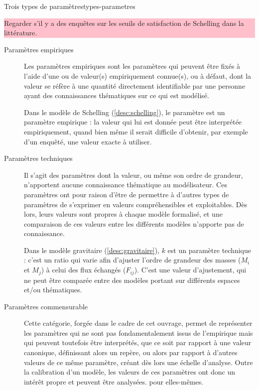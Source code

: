 \documentclass[12pt, a4paper, oneside]{book}
\begin{document}
	
	\begin{encadre}{Trois types de paramètres}{types-parametres}
		
		\colorbox{pink}{\parbox{0.9\textwidth}{%
				\vskip5pt
				Regarder s'il y a des enquêtes sur les seuils de satisfaction de Schelling dans la littérature.
				\vskip5pt
			}
		}
	
		\begin{description}
			\item[Paramètres empiriques] Les paramètres empiriques sont les paramètres qui peuvent être fixés à l'aide d'une ou de valeur(s) empiriquement connue(s), ou à défaut, dont la valeur se réfère à une quantité directement identifiable par une personne ayant des connaissances thématiques sur ce qui est modélisé.
			\begin{mdframed}[backgroundcolor=gray!10,footnoteinside=false]
				Dans le modèle de Schelling (\cref{desc:schelling}), le paramètre  est un paramètre empirique : la valeur qui lui est donnée peut être interprétée empiriquement, quand bien même il serait difficile d'obtenir, par exemple d'un enquêté, une valeur exacte à utiliser.
			\end{mdframed}
			\item[Paramètres techniques] Il s'agit des paramètres dont la valeur, ou même son ordre de grandeur, n'apportent aucune connaissance thématique au modélisateur. Ces paramètres ont pour raison d'être de permettre à d'autres types de paramètres de s'exprimer en valeurs compréhensibles et exploitables. Dès lors, leurs valeurs sont propres à chaque modèle formalisé, et une comparaison de ces valeurs entre les différents modèles n'apporte pas de connaissance.
			
			\begin{mdframed}[backgroundcolor=gray!10,footnoteinside=false]
				Dans le modèle gravitaire (\cref{desc:gravitaire}), $k$ est un paramètre technique : c'est un ratio qui varie afin d'ajuster l'ordre de grandeur des masses ($M_i$ et $M_j$) à celui des flux  échangés ($F_{ij}$). C'est une valeur d'ajustement, qui ne peut être comparée entre des modèles portant sur différents espaces et/ou thématiques\footnotemark.
			\end{mdframed}
			
			\item[Paramètres \og commensurable \fg{}]
			
			Cette catégorie, forgée dans le cadre de cet ouvrage, permet de représenter les paramètres qui ne sont pas fondamentalement issus de l'empirique mais qui peuvent toutefois être interprétés, que ce soit par rapport à une valeur canonique, définissant alors un repère, ou alors par rapport à d'autres valeurs de ce même paramètre, créant dès lors une échelle d'analyse. Outre la calibration d'un modèle, les valeurs de ces paramètres ont donc un intérêt propre et peuvent être analysées. pour elles-mêmes.
			

\end{description}
\end{encadre}
\end{document}
